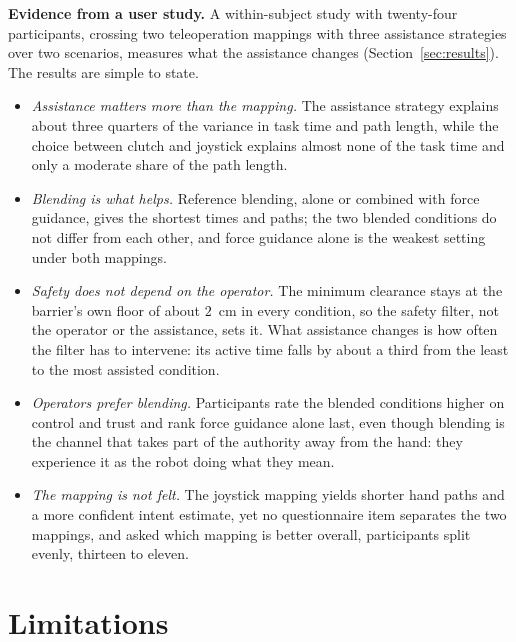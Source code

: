 \textbf{Evidence from a user study.} A within-subject study with twenty-four participants, crossing two teleoperation mappings with three assistance strategies over two scenarios, measures what the assistance changes (Section~\ref{sec:results}). The results are simple to state.
\begin{itemize}[nosep]
\item \emph{Assistance matters more than the mapping.} The assistance strategy explains about three quarters of the variance in task time and path length, while the choice between clutch and joystick explains almost none of the task time and only a moderate share of the path length.
\item \emph{Blending is what helps.} Reference blending, alone or combined with force guidance, gives the shortest times and paths; the two blended conditions do not differ from each other, and force guidance alone is the weakest setting under both mappings.
\item \emph{Safety does not depend on the operator.} The minimum clearance stays at the barrier's own floor of about $2$~cm in every condition, so the safety filter, not the operator or the assistance, sets it. What assistance changes is how often the filter has to intervene: its active time falls by about a third from the least to the most assisted condition.
\item \emph{Operators prefer blending.} Participants rate the blended conditions higher on control and trust and rank force guidance alone last, even though blending is the channel that takes part of the authority away from the hand: they experience it as the robot doing what they mean.
\item \emph{The mapping is not felt.} The joystick mapping yields shorter hand paths and a more confident intent estimate, yet no questionnaire item separates the two mappings, and asked which mapping is better overall, participants split evenly, thirteen to eleven.
\end{itemize}

\section{Limitations}
\label{sec:concllimitations}

